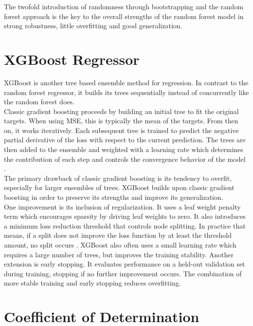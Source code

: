 The twofold introduction of randomness through bootstrapping and the random forest approach is the key to the overall strengths of the random forest model in strong robustness, little overfitting and good generalization.




\section{XGBoost Regressor}

XGBoost is another tree based ensemble method for regression. In contrast to the random forest regressor, it builds its trees sequentially instead of concurrently like the random forest does. \\
Classic gradient boosting proceeds by building an initial tree to fit the original targets. When using MSE, this is typically the mean of the targets. From then on, it works iteratively. Each subsequent tree is trained to predict the negative partial derivative of the loss with respect to the current prediction. The trees are then added to the ensemble and weighted with a learning rate which determines the contribution of each step and controls the convergence behavior of the model \cite{chen_xgboost_2016}. \\
The primary drawback of classic gradient boosting is its tendency to overfit, especially for larger ensembles of trees. XGBoost builds upon classic gradient boosting in order to preserve its strengths and improve its generalization. \\
One improvement is its inclusion of regularization. It uses a leaf weight penalty term which encourages sparsity by driving leaf weights to zero. It also introduces a minimum loss reduction threshold that controls node splitting. In practice that means, if a split does not improve the loss function by at least the threshold amount, no split occurs \cite{chen_xgboost_2016}. XGBoost also often uses a small learning rate which requires a large number of trees, but improves the training stability. Another extension is early stopping. It evaluates performance on a held-out validation set during training, stopping if no further improvement occurs. The combination of more stable training and early stopping reduces overfitting.




\section{Coefficient of Determination}\label{R2}


